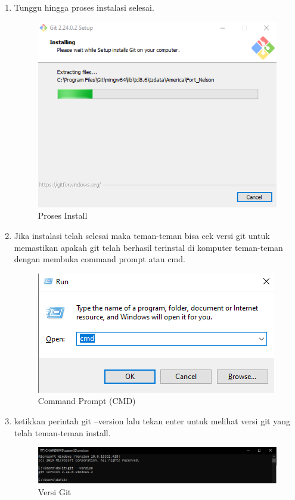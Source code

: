 \begin{enumerate}
\item Tunggu hingga proses instalasi selesai.
\begin{figure}[H]
\centering
\includegraphics[scale=.5]{figures/install_git12}
\caption{Proses Install}
\label{install_git12}
\end{figure}

\item Jika instalasi telah selesai maka teman-teman bisa cek versi git untuk memastikan apakah git telah berhasil terinstal di komputer teman-teman dengan membuka command prompt atau cmd.
\begin{figure}[H]
\centering
\includegraphics[scale=.5]{figures/install_git13}
\caption{Command Prompt (CMD)}
\label{install_git13}
\end{figure}

\item ketikkan perintah git --version lalu tekan enter untuk melihat versi git yang telah teman-teman install.
\begin{figure}[H]
\centering
\includegraphics[scale=.35]{figures/install_git14}
\caption{Versi Git}
\label{install_git14}
\end{figure}

\end{enumerate}

